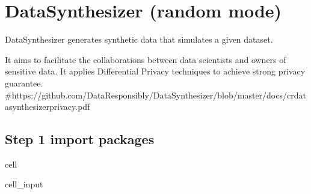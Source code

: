 \documentclass[letterpaper,10pt,english]{jupyterBook}
\begin{document}
\chapter{DataSynthesizer (random mode)}
\label{\detokenize{src/test/SynthNAV0:datasynthesizer-random-mode}}\label{\detokenize{src/test/SynthNAV0::doc}}
\sphinxAtStartPar
DataSynthesizer generates synthetic data that simulates a given dataset.

\sphinxAtStartPar
It aims to facilitate the collaborations between data scientists and owners of sensitive data. It applies Differential Privacy techniques to achieve strong privacy guarantee.
\#https://github.com/DataResponsibly/DataSynthesizer/blob/master/docs/cr\sphinxhyphen{}datasynthesizer\sphinxhyphen{}privacy.pdf


\section{Step 1 import packages}
\label{\detokenize{src/test/SynthNAV0:step-1-import-packages}}
\begin{sphinxuseclass}{cell}\begin{sphinxVerbatimInput}

\begin{sphinxuseclass}{cell_input}
\begin{sphinxVerbatim}[commandchars=\\\{\}]
   
   
   
    

   
\end{sphinxVerbatim}

\end{sphinxuseclass}\end{sphinxVerbatimInput}

\end{sphinxuseclass}
\end{document}
